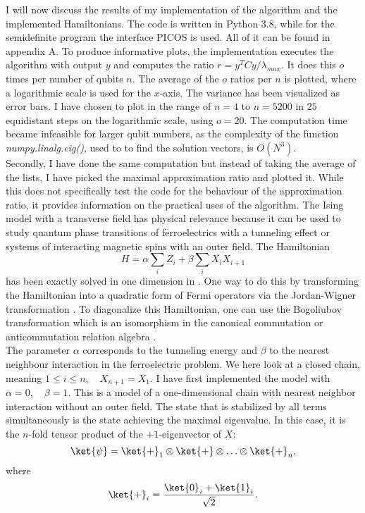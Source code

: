 I will now discuss the results of my implementation of the algorithm and the implemented Hamiltonians.
The code is written in Python 3.8, while for the semidefinite program the interface PICOS is used.
All of it can be found in appendix A.
To produce informative plots, the implementation executes the algorithm with output $y$ and computes the ratio $r=y^{T}Cy/\lambda_{max}$.
It does this $o$ times per number of qubits $n$.
The average of the $o$ ratios per $n$ is plotted, where a logarithmic scale is used for the $x$-axis.
The variance has been visualized as error bars.
I have chosen to plot in the range of $n=4$ to $n=5200$ in $25$ equidistant steps on the logarithmic scale, using $o=20$.
The computation time became infeasible for larger qubit numbers, as the complexity of the function \emph{numpy.linalg.eig()}, used to to find the solution vectors, is $O\left(N^3\right) $.\\
Secondly, I have done the same computation but instead of taking the average of the lists, I have picked the maximal approximation ratio and plotted it.
While this does not specifically test the code for the behaviour of the approximation ratio, it provides information on the practical uses of the algorithm.
The Ising model with a transverse field has physical relevance because it can be used to study quantum phase transitions of ferroelectrics with a tunneling effect or systems of interacting magnetic spins with an outer field.
The Hamiltonian
\[
H=\alpha \sum_{i} Z_i + \beta \sum_{i} X_iX_{i+1}
\]
has been exactly solved in one dimension in \cite{pfeuty70}.
One way to do this by transforming the Hamiltonian into a quadratic form of Fermi operators via the Jordan-Wigner transformation \cite{nielsen05}.
To diagonalize this Hamiltonian, one can use the Bogoliubov transformation which is an isomorphism in the canonical commutation or anticommutation relation algebra \cite{bogoljubov58}.\\
The parameter $\alpha$ corresponds to the tunneling energy and $\beta$ to the nearest neighbour interaction in the ferroelectric problem.
We here look at a closed chain, meaning $1\le i \le n, \quad X_{n+1}=X_{1}$.
I have first implemented the model with $\alpha =0, \quad \beta =1$.
This is a model of a one-dimensional chain with nearest neighbor interaction without an outer field.
The state that is stabilized by all terms simultaneously is the state achieving the maximal eigenvalue.
In this case, it is the $n$-fold tensor product of the $+1$-eigenvector of $X$: \[
	\ket{\psi}= \ket{+}_1\otimes\ket{+}\otimes\ldots\otimes\ket{+}_n
,\] where \[
\ket{+}_i= \frac{\ket{0}_i+\ket{1}_i}{\sqrt{2}}
.\]
